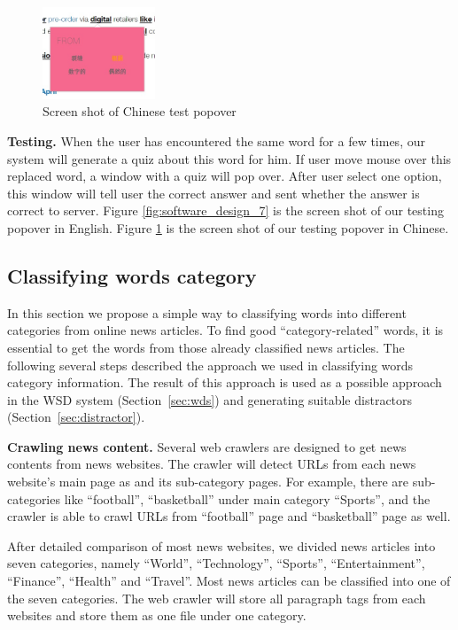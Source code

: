\begin{figure}[ht]
    \centering
  \includegraphics[width=0.3\textwidth]{software_design_8.jpg}
  \caption{Screen shot of Chinese test popover}
  \label{fig:software_design_8}
\end{figure}
{\bf Testing.} When the user has encountered the same word for a few times, our system will generate a quiz about this word for him.  If user move mouse over this replaced word, a window with a quiz will pop over. After user select one option, this window will tell user the correct answer and sent whether the answer is correct to server. Figure \ref{fig:software_design_7} is the screen shot of our testing popover in English. Figure \ref{fig:software_design_8} is the screen shot of our testing popover in Chinese.

\subsection{Classifying words category}
\label{subsec:category}
In this section we propose a simple way to classifying words into different categories from online news articles. To find good “category-related” words, it is essential to get the words from those already classified news articles. The following several steps described the approach we used in classifying words category information. The result of this approach is used as a possible approach in the WSD system (Section~\ref{sec:wds}) and generating suitable distractors (Section~\ref{sec:distractor}). 

{\bf Crawling news content.}
Several web crawlers are designed to get news contents from news websites. The crawler will detect URLs from each news website’s main page as and its sub-category pages. For example, there are sub-categories like “football”, “basketball” under main category “Sports”, and the crawler is able to crawl URLs from “football” page and “basketball” page as well. 

After detailed comparison of most news websites, we divided news articles into seven categories, namely “World”, “Technology”, “Sports”, “Entertainment”, “Finance”, “Health” and “Travel”. Most news articles can be classified into one of the seven categories. The web crawler will store all paragraph tags from each websites and store them as one file under one category. 

